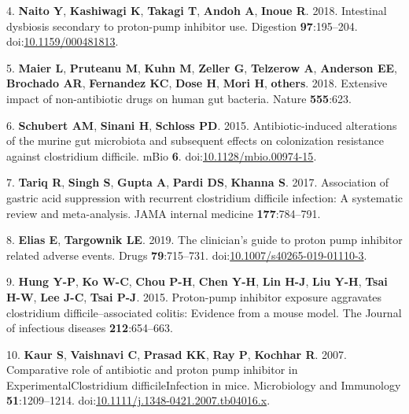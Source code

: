 \documentclass[11pt,]{article}
\begin{document}
\hypertarget{ref-Naito2018}{}
4. \textbf{Naito Y}, \textbf{Kashiwagi K}, \textbf{Takagi T},
\textbf{Andoh A}, \textbf{Inoue R}. 2018. Intestinal dysbiosis secondary
to proton-pump inhibitor use. Digestion \textbf{97}:195--204.
doi:\href{https://doi.org/10.1159/000481813}{10.1159/000481813}.

\hypertarget{ref-maier2018extensive}{}
5. \textbf{Maier L}, \textbf{Pruteanu M}, \textbf{Kuhn M},
\textbf{Zeller G}, \textbf{Telzerow A}, \textbf{Anderson EE},
\textbf{Brochado AR}, \textbf{Fernandez KC}, \textbf{Dose H},
\textbf{Mori H}, \textbf{others}. 2018. Extensive impact of
non-antibiotic drugs on human gut bacteria. Nature \textbf{555}:623.

\hypertarget{ref-Schubert2015}{}
6. \textbf{Schubert AM}, \textbf{Sinani H}, \textbf{Schloss PD}. 2015.
Antibiotic-induced alterations of the murine gut microbiota and
subsequent effects on colonization resistance against clostridium
difficile. mBio \textbf{6}.
doi:\href{https://doi.org/10.1128/mbio.00974-15}{10.1128/mbio.00974-15}.

\hypertarget{ref-tariq2017association}{}
7. \textbf{Tariq R}, \textbf{Singh S}, \textbf{Gupta A}, \textbf{Pardi
DS}, \textbf{Khanna S}. 2017. Association of gastric acid suppression
with recurrent clostridium difficile infection: A systematic review and
meta-analysis. JAMA internal medicine \textbf{177}:784--791.

\hypertarget{ref-Elias2019}{}
8. \textbf{Elias E}, \textbf{Targownik LE}. 2019. The clinician's guide
to proton pump inhibitor related adverse events. Drugs
\textbf{79}:715--731.
doi:\href{https://doi.org/10.1007/s40265-019-01110-3}{10.1007/s40265-019-01110-3}.

\hypertarget{ref-hung2015proton}{}
9. \textbf{Hung Y-P}, \textbf{Ko W-C}, \textbf{Chou P-H}, \textbf{Chen
Y-H}, \textbf{Lin H-J}, \textbf{Liu Y-H}, \textbf{Tsai H-W}, \textbf{Lee
J-C}, \textbf{Tsai P-J}. 2015. Proton-pump inhibitor exposure aggravates
clostridium difficile--associated colitis: Evidence from a mouse model.
The Journal of infectious diseases \textbf{212}:654--663.

\hypertarget{ref-Kaur2007}{}
10. \textbf{Kaur S}, \textbf{Vaishnavi C}, \textbf{Prasad KK},
\textbf{Ray P}, \textbf{Kochhar R}. 2007. Comparative role of antibiotic
and proton pump inhibitor in ExperimentalClostridium difficileInfection
in mice. Microbiology and Immunology \textbf{51}:1209--1214.
doi:\href{https://doi.org/10.1111/j.1348-0421.2007.tb04016.x}{10.1111/j.1348-0421.2007.tb04016.x}.
\end{document}
